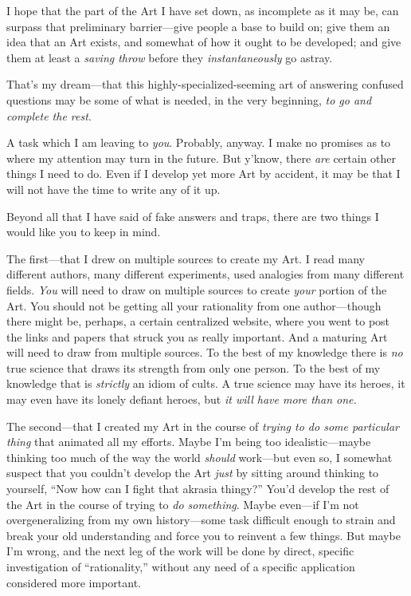 {
 I hope that the part of the Art I have set down, as incomplete as
it may be, can surpass that preliminary barrier---give people a base to
build on; give them an idea that an Art exists, and somewhat of how it
ought to be developed; and give them at least a \textit{saving throw}
before they \textit{instantaneously} go astray.}

{
 That's my dream---that this
highly-specialized-seeming art of answering confused questions may be
some of what is needed, in the very beginning, \textit{to go and
complete the rest}.}

{
 A task which I am leaving to \textit{you}. Probably, anyway. I
make no promises as to where my attention may turn in the future. But
y'know, there \textit{are} certain other things I need
to do. Even if I develop yet more Art by accident, it may be that I
will not have the time to write any of it up.}

{
 Beyond all that I have said of fake answers and traps, there are
two things I would like you to keep in mind.}

{
 The first---that I drew on multiple sources to create my Art. I
read many different authors, many different experiments, used analogies
from many different fields. \textit{You} will need to draw on multiple
sources to create \textit{your} portion of the Art. You should not be
getting all your rationality from one author---though there might be,
perhaps, a certain centralized website, where you went to post the
links and papers that struck you as really important. And a maturing
Art will need to draw from multiple sources. To the best of my
knowledge there is \textit{no} true science that draws its strength
from only one person. To the best of my knowledge that is
\textit{strictly} an idiom of cults. A true science may have its
heroes, it may even have its lonely defiant heroes, but \textit{it will
have more than one.}}

{
 The second---that I created my Art in the course of \textit{trying
to do some particular thing} that animated all my efforts. Maybe
I'm being too idealistic---maybe thinking too much of
the way the world \textit{should} work---but even so, I somewhat
suspect that you couldn't develop the Art \textit{just}
by sitting around thinking to yourself, ``Now how can
I fight that akrasia thingy?'' You'd
develop the rest of the Art in the course of trying to \textit{do
something}. Maybe even---if I'm not overgeneralizing
from my own history---some task difficult enough to strain and break
your old understanding and force you to reinvent a few things. But
maybe I'm wrong, and the next leg of the work will be
done by direct, specific investigation of
``rationality,'' without any need of
a specific application considered more important.}

